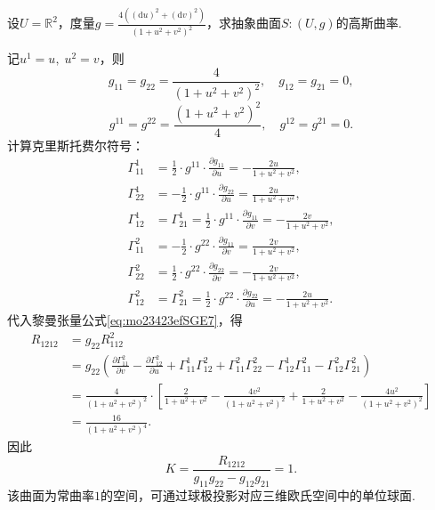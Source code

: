 \documentclass[../../main.tex]{subfiles}%
\begin{document}
\begin{example}
设$U=\mathbb{R}^2$，度量$g=\frac{4\left((\mathrm{d}u)^2+(\mathrm{d}v)^2\right)}{\left(1+u^2+v^2\right)^2}$，求抽象曲面$S:(U,g)$的高斯曲率.
\end{example}
\begin{solution}
记$u^1=u,\;u^2=v$，则
$$g_{11}=g_{22}=\frac{4}{\left(1+u^2+v^2\right)^2},\quad g_{12}=g_{21}=0,$$
$$g^{11}=g^{22}=\frac{\left(1+u^2+v^2\right)^2}{4},\quad g^{12}=g^{21}=0.$$
计算克里斯托费尔符号：
\begin{align*}
\Gamma^1_{11}&=\frac12\cdot g^{11}\cdot\frac{\partial g_{11}}{\partial u}=-\frac{2u}{1+u^2+v^2},\\
\Gamma^1_{22}&=-\frac12\cdot g^{11}\cdot\frac{\partial g_{22}}{\partial u}=\frac{2u}{1+u^2+v^2},\\
\Gamma^1_{12}&=\Gamma^1_{21}=\frac12\cdot g^{11}\cdot\frac{\partial g_{11}}{\partial v}=-\frac{2v}{1+u^2+v^2},\\
\Gamma^2_{11}&=-\frac12\cdot g^{22}\cdot\frac{\partial g_{11}}{\partial v}=\frac{2v}{1+u^2+v^2},\\
\Gamma^2_{22}&=\frac12\cdot g^{22}\cdot\frac{\partial g_{22}}{\partial v}=-\frac{2v}{1+u^2+v^2},\\
\Gamma^2_{12}&=\Gamma^2_{21}=\frac12\cdot g^{22}\cdot\frac{\partial g_{22}}{\partial u}=-\frac{2u}{1+u^2+v^2}.
\end{align*}
代入黎曼张量公式\eqref{eq:mo23423efSGE7}，得
\begin{align*}
R_{1212}&=g_{22}R^2_{112}\\
&=g_{22}\left(\frac{\partial\Gamma^2_{11}}{\partial v}-\frac{\partial\Gamma^2_{12}}{\partial u}+\Gamma^1_{11}\Gamma^2_{12}+\Gamma^2_{11}\Gamma^2_{22}-\Gamma^1_{12}\Gamma^2_{11}-\Gamma^2_{12}\Gamma^2_{21}\right)\\
&=\frac{4}{\left(1+u^2+v^2\right)^2}\cdot\left[\frac{2}{1+u^2+v^2}-\frac{4v^2}{\left(1+u^2+v^2\right)^2}+\frac{2}{1+u^2+v^2}-\frac{4u^2}{\left(1+u^2+v^2\right)^2}\right]\\
&=\frac{16}{\left(1+u^2+v^2\right)^4}.
\end{align*}
因此
$$K=\frac{R_{1212}}{g_{11}g_{22}-g_{12}g_{21}}=1.$$
该曲面为常曲率$1$的空间，可通过球极投影对应三维欧氏空间中的单位球面.
\end{solution}
\end{document}
